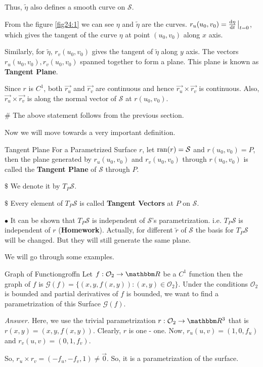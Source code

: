 \documentclass[../Analysis-3]{subfiles}
\begin{document}
Thus, $\tilde{\eta}$ also defines a smooth curve on $\mathcal{S}$.

From the figure \ref{fig24:1} we can see $\eta$ and $\tilde{\eta}$ are the curves. $r_u(u_0,v_0)=\dv{\eta}{t}\eval_{t=0}$, which gives the tangent of the curve $\eta$ at point $(u_0,v_0)$ along $x$ axis.

Similarly, for $\tilde{\eta}$, $r_v(u_0,v_0)$  gives the tangent of $\tilde{\eta}$ along $y$ axis. The vectors $r_u(u_0,v_0),r_v(u_0,v_0)$ spanned together to form a plane. This plane is known as \textbf{Tangent Plane}.

Since $r$ is $C^1$, both $\vec{r_u}$ and $\vec{r_v}$ are continuous and hence $\vec{r_u} \times \vec{r_v}$ is continuous. Also, $\vec{r_u} \times \vec{r_v}$ is along the normal vector of $\mathcal{S}$ at $r(u_0,v_0)$.

$\#$ The above statement follows from the previous section.

Now we will move towards a very important definition.

\begin{Def}{Tangent Plane}{}
    For a Parametrized Surface $r$, let $\operatorname{ran}(r)=\mathcal{S}$ and $r(u_0,v_0)=P$, then the plane generated by $r_u(u_0,v_0)$ and $r_v(u_0,v_0)$ through $r(u_0,v_0)$ is called the \textbf{Tangent Plane} of $\mathcal{S}$ through $P$.

    $\$$ We denote it by $T_P\mathcal{S}$.

    $\$$ Every element of $T_P\mathcal{S}$ is called \textbf{Tangent Vectors} at $P$ on $\mathcal{S}$.
\end{Def}

$\bullet$ It can be shown that $T_P\mathcal{S}$ is independent of $\mathcal{S}$'s parametrization. i.e. $T_P\mathcal{S}$ is independent of $r$ (\textbf{Homework}). Actually, for different $\tilde{r}$ of $\mathcal{S}$ the basis for $T_P\mathcal{S}$ will be changed. But they will still generate the same plane.

\vspace{0.2cm}

We will go through some examples.

\begin{Eg}{Graph of Function}{groffn}
    Let $f : \mathcal{O}_2 \to \R$ be a $C^1$ function then the graph of $f$ is $\mathcal{G}(f) = \{ (x,y,f(x,y)) : (x,y)\in \mathcal{O}_2\}$. Under the conditions $\mathcal{O}_2$ is bounded and partial derivatives of $f$ is bounded, we want to find a parametrization of this Surface $\mathcal{G}(f)$.

    \textit{Answer.} Here, we use the trivial parametrization $r : \mathcal{O}_2 \to \R^3$ that is $ r(x,y) = (x,y,f(x,y))$. Clearly, $r$ is one - one. Now, $r_u(u,v) = (1,0,f_u)$ and $r_v(u,v) = (0,1,f_v)$.

    So, $ r_u \times r_v = (-f_u,-f_v,1) \neq \vec{0}$. So, it is a parametrization of the surface.
\end{Eg}
\end{document}
